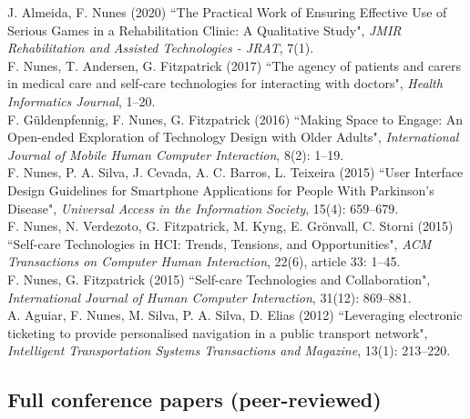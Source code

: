 \documentclass[11pt, a4paper]{article} %
\newcommand{\years}[1]{\marginnote{\scriptsize #1}} %
\begin{document}
\years{2020}J. Almeida, F. Nunes (2020) ``The Practical Work of Ensuring Effective Use of Serious Games in a Rehabilitation Clinic: A Qualitative Study", \emph{JMIR Rehabilitation and Assisted Technologies - JRAT}, 7(1).\\
\years{2017}F. Nunes, T. Andersen, G. Fitzpatrick (2017) ``The agency of patients and carers in medical care and self-care technologies for interacting with doctors", \emph{Health Informatics Journal}, 1--20.\\
\years{2016}F. Güldenpfennig, F. Nunes, G. Fitzpatrick (2016) ``Making Space to Engage: An Open-ended Exploration of Technology Design with Older Adults", \emph{International Journal of Mobile Human Computer Interaction}, 8(2): 1--19.\\
\years{2016}F. Nunes, P. A. Silva, J. Cevada, A. C. Barros, L. Teixeira (2015) ``User Interface Design Guidelines for Smartphone Applications for People With Parkinson's Disease", \emph{Universal Access in the Information Society}, 15(4): 659--679.\\
\years{2015}F. Nunes, N. Verdezoto, G. Fitzpatrick, M. Kyng, E. Grönvall, C. Storni (2015) ``Self-care Technologies in HCI: Trends, Tensions, and Opportunities", \emph{ACM Transactions on Computer Human Interaction}, 22(6), article 33: 1--45.\\
\years{2015}F. Nunes, G. Fitzpatrick (2015) ``Self-care Technologies and Collaboration", \emph{International Journal of Human Computer Interaction}, 31(12): 869--881.\\
\years{2012}A. Aguiar, F. Nunes, M. Silva, P. A. Silva, D. Elias (2012) ``Leveraging electronic ticketing to provide personalised navigation in a public transport network", \emph{Intelligent Transportation Systems Transactions and Magazine}, 13(1): 213–220.


\subsection*{Full conference papers (peer-reviewed)}
\end{document}
